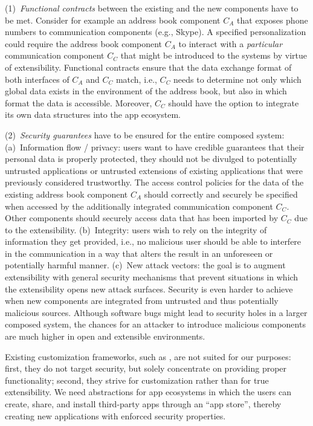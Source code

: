 \documentclass{src/acm_proc_article-sp} \else
\begin{document}
(1)~\emph{Functional contracts} between the existing and the
new components have to be met. Consider for example an
address book component $C_A$ that exposes phone numbers to
communication components (e.g., Skype). A specified
personalization could require the address book component
$C_A$ to interact with a \emph{particular} communication component
$C_C$ that might be introduced to the systems by virtue of
extensibility. Functional contracts ensure that the data
exchange format of both interfaces of $C_A$ and $C_C$ match,
i.e., $C_C$ needs to determine not only which global data
exists in the environment of the address book, but also in
which format the data is accessible. Moreover, $C_C$ should
have the option to integrate its own data structures into
the app ecosystem.


(2)~\emph{Security guarantees} have to be ensured for the
entire composed system: (a)~Information flow / privacy:
users want to have credible guarantees that their personal
data is properly protected, they should not be divulged to
potentially untrusted applications or untrusted extensions
of existing applications that were previously considered
trustworthy. The access control policies for the data of the
existing address book component $C_A$ should correctly and
securely be specified when accessed by the additionally
integrated communication component $C_C$. Other components
should securely access data that has been imported by $C_C$
due to the extensibility. (b)~Integrity: users wish to rely
on the integrity of information they get provided, i.e., no
malicious user should be able to interfere in the
communication in a way that alters the result in an
unforeseen or potentially harmful manner. (c)~New attack
vectors: the goal is to augment extensibility with general
security mechanisms that prevent situations in which the
extensibility opens new attack surfaces.
Security is even harder to achieve when new components are
integrated from untrusted and thus potentially malicious
sources. Although software bugs might lead to security holes
in a larger composed system, the chances for an attacker to
introduce malicious components are much higher in open and
extensible environments.



Existing customization frameworks, such as
\cite{Hagemann:2010Mashups,Jansen10:CustomizationMultiTenant,Tesoriero2010:CAUCE,KOL09:WYSIWYG,Kapitsaki2009:ContextAwareWebApps,Ceri2007:ContextAwareWebApps,Bolin:2005CustRendWebPages,Rossi01:PersonalizedWebApps,Danculovic:2001PersWebApps,WebML2000a},
are not suited for our purposes: first, they do not target
security, but solely concentrate on providing proper
functionality; second, they strive for customization rather
than for true extensibility.
We need abstractions for app ecosystems in which the users
can create, share, and install third-party apps through an
``app store'', thereby creating new applications with
enforced security properties.
\end{document}
